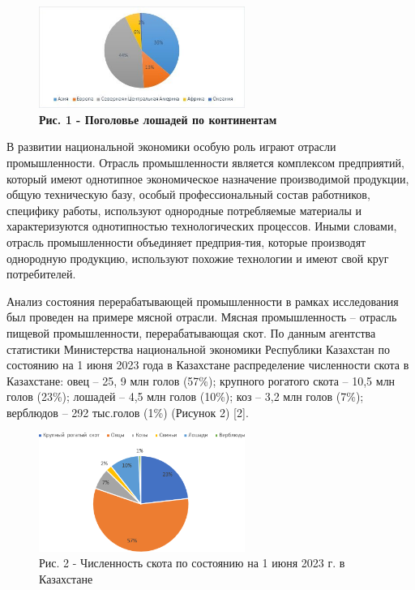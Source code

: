 \begin{figure}[H]
	\centering
	\includegraphics[width=0.6\textwidth]{assets/307-1}
	\caption*{\bfseries Рис. 1 - Поголовье лошадей по континентам}
\end{figure}

\begin{multicols}{2}

В развитии национальной экономики особую роль играют отрасли
промышленности. Отрасль промышленности является комплексом предприятий,
который имеют однотипное экономическое назначение производимой
продукции, общую техническую базу, особый профессиональный состав
работников, специфику работы, используют однородные потребляемые
материалы и характеризуются однотипностью технологических процессов.
Иными словами, отрасль промышленности объединяет предприя-тия, которые
производят однородную продукцию, используют похожие технологии и имеют
свой круг потребителей.

Анализ состояния перерабатывающей промышленности в рамках исследования
был проведен на примере мясной отрасли. Мясная промышленность -- отрасль
пищевой промышленности, перерабатывающая скот. По данным агентства
статистики Министерства национальной экономики Республики Казахстан по
состоянию на 1 июня 2023 года в Казахстане распределение численности
скота в Казахстане: овец -- 25, 9 млн голов (57\%); крупного рогатого
скота -- 10,5 млн голов (23\%); лошадей -- 4,5 млн голов (10\%); коз --
3,2 млн голов (7\%); верблюдов -- 292 тыс.голов (1\%) (Рисунок 2)
{[}2{]}.
\end{multicols}

\begin{figure}[H]
	\centering
	\includegraphics[width=0.6\textwidth]{assets/307}
	\caption*{Рис. 2 - Численность скота по состоянию на 1 июня 2023 г. в Казахстане}
\end{figure}

